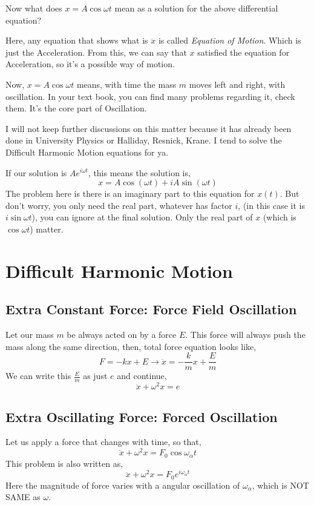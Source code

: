\documentclass[11pt, a4paper]{memoir}
\begin{document}
Now what does $x = A \cos \omega t$ mean as a solution for the above differential equation?

Here, any equation that shows what is $ \ddot{x}$ is called \emph{Equation of Motion}. Which is just the Acceleration. From this, we can say that $x$ satisfied the equation for Acceleration, so it's a possible way of motion.

Now, $x = A \cos \omega t$ means, with time the mass $m$ moves left and right, with oscillation. In your text book, you can find many problems regarding it, check them. It's the core part of Oscillation. 

I will not keep further discussions on this matter because it has already been done in University Physics or Halliday, Resnick, Krane. I tend to solve the Difficult Harmonic Motion equations for ya.

If our solution is $Ae^{i \omega t}$, this means the solution is,
\[ 
    x = A \cos \left( \omega t \right)  + i A \sin \left( \omega t \right) 
\]
The problem here is there is an imaginary part to this equation for $x\left( t \right) $. But don't worry, you only need the real part, whatever has factor $i$, (in this case it is $i \sin \omega t$), you can ignore at the final solution. Only the real part of $x$ (which is $\cos \omega t$) matter. 


\section{ Difficult Harmonic Motion}


\subsection{ Extra Constant Force: Force Field Oscillation} 
Let our mass $m$ be always acted on by a force $E$. This force will always push the mass along the same direction, then, total force equation looks like,
\[ 
F = - kx + E \to \ddot{x} = -\frac{k}{m}x + \frac{E}{m}
\]
We can write this $\frac{E}{m}$ as just $e$ and continue,
\[ 
\boxed{ \ddot{x} + \omega^2 x = e}
\]

\subsection{ Extra Oscillating Force: Forced Oscillation}
Let us apply a force that changes with time, so that, 
\[ 
\boxed{ \ddot{x} + \omega^2 x = F_0 \cos \omega_{ \alpha} t}
\]
This problem is also written as,
\[ 
\boxed{ \ddot{x} + \omega^2 x = F_0 e^{i \omega_{ \alpha} t}}
\]
Here the magnitude of force varies with a angular oscillation of $\omega_{ \alpha}$, which is NOT SAME as $\omega$.
\end{document}
